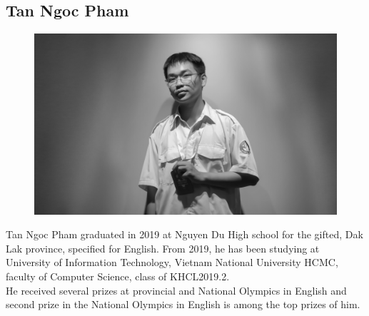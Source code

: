 \documentclass[conference,compsoc]{IEEEtran}
\begin{document}
\subsection*{Tan Ngoc Pham}
\begin{figure}[h!]
    \centering
    \includegraphics[scale=0.03]{NT}
    \label{fig:my_label}
\end{figure} 
Tan Ngoc Pham graduated in 2019 at Nguyen Du High school for the gifted, Dak Lak province, specified for English. From 2019, he has been studying at University of Information Technology, Vietnam National University HCMC, faculty of Computer Science, class of KHCL2019.2.\\

He received several prizes at provincial and National Olympics in English and second prize in the National Olympics in English is among the top prizes of him.

%
%
\end{document}

